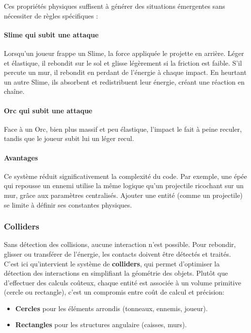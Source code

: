 \documentclass[a4paper,11pt]{article}
\begin{document}
Ces propriétés physiques suffisent à générer des situations émergentes sans nécessiter de règles spécifiques :

\paragraph{Slime qui subit une attaque}
Lorsqu’un joueur frappe un Slime, la force appliquée le projette en arrière. Léger et élastique, il rebondit sur le sol et glisse légèrement si la friction est faible. S’il percute un mur, il rebondit en perdant de l’énergie à chaque impact. En heurtant un autre Slime, ils absorbent et redistribuent leur énergie, créant une réaction en chaîne.

\paragraph{Orc qui subit une attaque}
Face à un Orc, bien plus massif et peu élastique, l’impact le fait à peine reculer, tandis que le joueur subit lui un léger recul.

\paragraph{Avantages}  
Ce système réduit significativement la complexité du code. Par exemple, une épée qui repousse un ennemi utilise la même logique qu’un projectile ricochant sur un mur, grâce aux paramètres centralisés. Ajouter une entité (comme un projectile) se limite à définir ses constantes physiques.

\subsubsection{Colliders}
\label{sec:colliders}

Sans détection des collisions, aucune interaction n'est possible. Pour rebondir, glisser ou transférer de l’énergie, les contacts doivent être détectés et traités. \\

C’est ici qu’intervient le système de \textbf{colliders}, qui permet d’optimiser la détection des interactions en simplifiant la géométrie des objets. Plutôt que d’effectuer des calculs coûteux, chaque entité est associée à un volume primitive (cercle ou rectangle), c'est un compromis entre coût de calcul et précision: \\
\begin{itemize}
    \item \textbf{Cercles} pour les éléments arrondis (tonneaux, ennemis, joueur).
    \item \textbf{Rectangles} pour les structures angulaire (caisses, murs).
\end{itemize}
\end{document}
